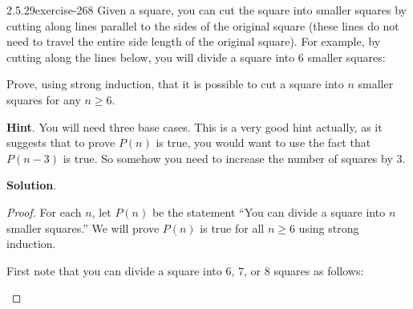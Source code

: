 \documentclass[twoside,11pt,]{book}
\numberwithin{equation}{chapter}
\begin{document}
\begin{divisionsolution}{2.5.29}{}{exercise-268}%
\hypertarget{p-3713}{}%
Given a square, you can cut the square into smaller squares by cutting along lines parallel to the sides of the original square (these lines do not need to travel the entire side length of the original square). For example, by cutting along the lines below, you will divide a square into 6 smaller squares:%
\begin{sidebyside}{1}{0.325}{0.325}{0}%
\begin{sbspanel}{0.35}%
\end{sbspanel}%
\end{sidebyside}%
\par
\hypertarget{p-3714}{}%
Prove, using strong induction, that it is possible to cut a square into \(n\) smaller squares for any \(n \ge 6\).%
\par\smallskip%
\noindent\textbf{Hint}.\quad%
\hypertarget{p-3715}{}%
You will need three base cases.  This is a very good hint actually, as it suggests that to prove \(P(n)\) is true, you would want to use the fact that \(P(n-3)\) is true.  So somehow you need to increase the number of squares by 3.%
\par\smallskip%
\noindent\textbf{Solution}.\quad%
\begin{proof}{}
\hypertarget{p-3716}{}%
For each \(n\), let \(P(n)\) be the statement ``You can divide a square into \(n\) smaller squares.'' We will prove \(P(n)\) is true for all \(n \ge 6\) using strong induction.%
\par
\hypertarget{p-3717}{}%
First note that you can divide a square into \(6\), \(7\), or \(8\) squares as follows:%
\begin{sidebyside}{3}{0.0166666666666667}{0.0166666666666667}{0.0333333333333333}%
\begin{sbspanel}{0.3}%
\end{sbspanel}%
\begin{sbspanel}{0.3}%
\resizebox{\linewidth}{!}{{
\begin{tikzpicture}[scale=.75]

\end{tikzpicture}}}
\end{sbspanel}
\end{sidebyside}
\end{proof}
\end{divisionsolution}
\end{document}
